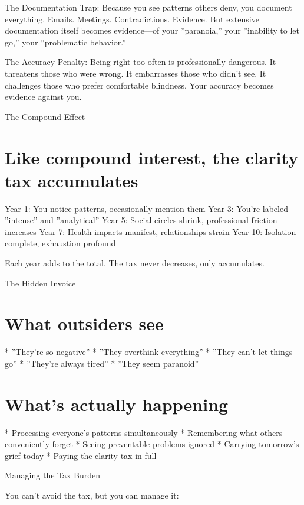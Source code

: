 \documentclass[12pt,oneside]{book}
\begin{document}
The Documentation Trap: Because you see patterns others deny, you document everything. Emails. Meetings. Contradictions. Evidence. But extensive documentation itself becomes evidence---of your ''paranoia,'' your ''inability to let go,'' your ''problematic behavior.''

The Accuracy Penalty: Being right too often is professionally dangerous. It threatens those who were wrong. It embarrasses those who didn't see. It challenges those who prefer comfortable blindness. Your accuracy becomes evidence against you.

The Compound Effect

\section{Like compound interest, the clarity tax accumulates}

Year 1: You notice patterns, occasionally mention them Year 3: You're labeled ''intense'' and ''analytical'' Year 5: Social circles shrink, professional friction increases Year 7: Health impacts manifest, relationships strain Year 10: Isolation complete, exhaustion profound

Each year adds to the total. The tax never decreases, only accumulates.

The Hidden Invoice

\section{What outsiders see}

                    * ''They're so negative''
                    * ''They overthink everything''
                    * ''They can't let things go''
                    * ''They're always tired''
                    * ''They seem paranoid''

\section{What's actually happening}

                    * Processing everyone's patterns simultaneously
                    * Remembering what others conveniently forget
                    * Seeing preventable problems ignored
                    * Carrying tomorrow's grief today
                    * Paying the clarity tax in full

Managing the Tax Burden

You can't avoid the tax, but you can manage it:
\end{document}
